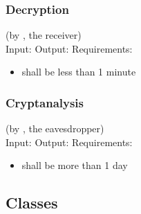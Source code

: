 \subsubsection{Decryption}
(by \bob, the receiver) \\ \medskip
Input: \decryptin
Output: \decryptout
Requirements:
\begin{itemize}
\item \decrypttime{} shall be less than 1 minute
\end{itemize}

\subsubsection{Cryptanalysis}
(by \eve, the eavesdropper) \\ \medskip
Input: \cryptanalyzein
Output: \cryptanalyzeout
Requirements:
\begin{itemize}
\item \cryptanalyzetime{} shall be more than 1 day
\end{itemize}


\subsection{Classes}
\lstset{language=C++} %

\subsubsection{\code{\cs/}}

\codes{}

\codes{}

\subsubsection{}

\codes{}

\codes{}

\codes{}

\codes{}

\subsubsection{}
\codes{}

